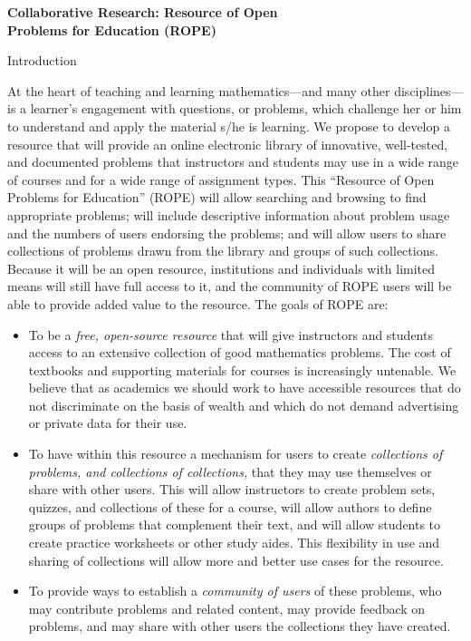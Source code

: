 \documentclass[11pt]{article}
\begin{document}
\begin{center}
{\Large \textbf{Collaborative Research: Resource of Open\\
Problems for Education (ROPE)}}
\end{center}

\begin{section}{Introduction}

At the heart of teaching and learning mathematics---and many other
disciplines---is a learner's engagement with questions, or problems, which
challenge her or him to understand and apply the material s/he is
learning.  We propose to develop a resource that will provide an online 
electronic library of innovative, well-tested, and documented problems that
instructors and students may use in a wide range of courses and for a wide
range of assignment types.  This ``Resource of Open Problems for
Education'' (ROPE) will allow searching and browsing to find appropriate
problems; will include descriptive information about problem usage and the
numbers of users endorsing the problems; and will allow users to share
collections of problems drawn from the library and groups of such
collections.  Because it will be 
an open resource, institutions and individuals with limited means will
still have full access to it, and the community of ROPE users will be able
to provide added value to the resource.  The goals of ROPE are:
\begin{itemize}
  \item
    To be a \textit{free, open-source resource} that will give instructors
    and students access to an extensive collection of good mathematics
    problems.  The cost of textbooks and supporting materials for courses
    is increasingly untenable.  We believe that as academics
    we should work to have accessible resources that do not
    discriminate on the basis of wealth and which do not demand
    advertising or private data for their use.
  \item
    To have within this resource a mechanism for users to create
    \textit{collections of problems, and collections of collections,} 
    that they may use themselves or share with other users.
    This will allow instructors to create problem sets, quizzes, and
    collections of these for a course, will allow authors to define groups
    of problems that complement their text, and will allow students to create practice
    worksheets or other study aides.  This flexibility in use and
    sharing of collections will allow more and better use cases for the
    resource. 
  \item
    To provide ways to establish a \textit{community of users} of these
    problems, who may contribute problems and related content, may provide
    feedback on problems, and may share with other users the collections
    they have created.
\end{itemize}

\end{section}
\end{document}

